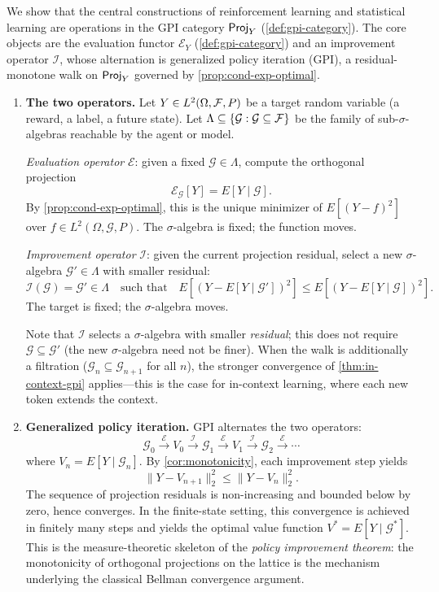 \begin{example}\label{ex:ml-sigma}
We show that the central constructions of reinforcement learning and statistical learning are operations in the GPI category $\mathsf{Proj}_Y$ (\cref{def:gpi-category}). The core objects are the evaluation functor $\mathcal{E}_Y$ (\cref{def:gpi-category}) and an improvement operator $\mathcal{I}$, whose alternation is generalized policy iteration (GPI), a residual-monotone walk on $\mathsf{Proj}_Y$ governed by \cref{prop:cond-exp-optimal}.

\begin{enumerate}[label=(\alph*)]

\item \textbf{The two operators.} Let $Y \in L^2(\Omega, \mathcal{F}, P)$ be a target random variable (a reward, a label, a future state). Let $\Lambda \subseteq \{\mathcal{G} : \mathcal{G} \subseteq \mathcal{F}\}$ be the family of sub-$\sigma$-algebras reachable by the agent or model.

\emph{Evaluation operator} $\mathcal{E}$: given a fixed $\mathcal{G} \in \Lambda$, compute the orthogonal projection
\[
\mathcal{E}_{\mathcal{G}}[Y] = E[Y \mid \mathcal{G}].
\]
By \cref{prop:cond-exp-optimal}, this is the unique minimizer of $E[(Y - f)^2]$ over $f \in L^2(\Omega, \mathcal{G}, P)$. The $\sigma$-algebra is fixed; the function moves.

\emph{Improvement operator} $\mathcal{I}$: given the current projection residual, select a new $\sigma$-algebra $\mathcal{G}' \in \Lambda$ with smaller residual:
\[
\mathcal{I}(\mathcal{G}) = \mathcal{G}' \in \Lambda \quad \text{such that} \quad E[(Y - E[Y \mid \mathcal{G}'])^2] \leq E[(Y - E[Y \mid \mathcal{G}])^2].
\]
The target is fixed; the $\sigma$-algebra moves.

Note that $\mathcal{I}$ selects a $\sigma$-algebra with smaller \emph{residual}; this does not require $\mathcal{G} \subseteq \mathcal{G}'$ (the new $\sigma$-algebra need not be finer). When the walk is additionally a filtration ($\mathcal{G}_n \subseteq \mathcal{G}_{n+1}$ for all $n$), the stronger convergence of \cref{thm:in-context-gpi} applies---this is the case for in-context learning, where each new token extends the context.

\item \textbf{Generalized policy iteration.} GPI alternates the two operators:
\[
\mathcal{G}_0 \xrightarrow{\;\mathcal{E}\;} V_0 \xrightarrow{\;\mathcal{I}\;} \mathcal{G}_1 \xrightarrow{\;\mathcal{E}\;} V_1 \xrightarrow{\;\mathcal{I}\;} \mathcal{G}_2 \xrightarrow{\;\mathcal{E}\;} \cdots
\]
where $V_n = E[Y \mid \mathcal{G}_n]$. By \cref{cor:monotonicity}, each improvement step yields
\[
\|Y - V_{n+1}\|_2^2 \leq \|Y - V_n\|_2^2.
\]
The sequence of projection residuals is non-increasing and bounded below by zero, hence converges. In the finite-state setting, this convergence is achieved in finitely many steps and yields the optimal value function $V^* = E[Y \mid \mathcal{G}^*]$. This is the measure-theoretic skeleton of the \emph{policy improvement theorem}: the monotonicity of orthogonal projections on the lattice is the mechanism underlying the classical Bellman convergence argument.


\end{enumerate}
\end{example}
